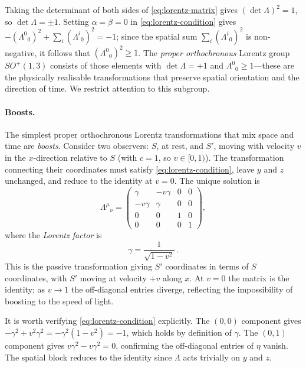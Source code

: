 Taking the determinant of both sides of \cref{eq:lorentz-matrix} gives
$(\det\Lambda)^2 = 1$, so $\det\Lambda = \pm 1$.  Setting $\alpha = \beta = 0$
in \cref{eq:lorentz-condition} gives
$-(\Lambda^0{}_0)^2 + \sum_i (\Lambda^i{}_0)^2 = -1$; since the spatial sum
$\sum_i (\Lambda^i{}_0)^2$ is non-negative, it follows that
$(\Lambda^0{}_0)^2 \geq 1$.  The \emph{proper orthochronous} Lorentz group
$SO^+(1,3)$ consists of those elements with $\det\Lambda = +1$ and
$\Lambda^0{}_0 \geq 1$---these are the physically realisable transformations
that preserve spatial orientation and the direction of time.  We restrict
attention to this subgroup.

\paragraph{Boosts.}

The simplest proper orthochronous Lorentz transformations that mix space and
time are \emph{boosts}.  Consider two observers: $S$, at rest, and $S'$, moving
with velocity $v$ in the $x$-direction relative to $S$ (with $c = 1$, so
$v \in [0,1)$).  The transformation connecting their coordinates must satisfy
\cref{eq:lorentz-condition}, leave $y$ and $z$ unchanged, and reduce to the
identity at $v = 0$.  The unique solution is
%
\begin{equation}
  \Lambda^\mu{}_\nu
    = \begin{pmatrix}
        \gamma   & -v\gamma & 0 & 0 \\
        -v\gamma & \gamma   & 0 & 0 \\
        0        & 0        & 1 & 0 \\
        0        & 0        & 0 & 1
      \end{pmatrix} ,
  \label{eq:boost-matrix}
\end{equation}
%
where the \emph{Lorentz factor} is
%
\begin{equation}
  \gamma = \frac{1}{\sqrt{1 - v^2}} \,.
  \label{eq:lorentz-factor}
\end{equation}
%
This is the passive transformation giving $S'$ coordinates in terms of $S$
coordinates, with $S'$ moving at velocity $+v$ along $x$.  At $v = 0$ the
matrix is the identity; as $v \to 1$ the off-diagonal entries diverge,
reflecting the impossibility of boosting to the speed of light.

It is worth verifying \cref{eq:lorentz-condition} explicitly.  The $(0,0)$
component gives $-\gamma^2 + v^2\gamma^2 = -\gamma^2(1 - v^2) = -1$, which
holds by definition of $\gamma$.  The $(0,1)$ component gives $v\gamma^2 -
v\gamma^2 = 0$, confirming the off-diagonal entries of $\eta$ vanish.  The
spatial block reduces to the identity since $\Lambda$ acts trivially on $y$ and
$z$.

